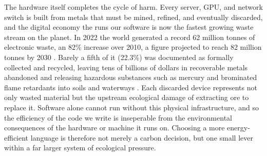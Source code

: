 The hardware itself completes the cycle of harm. Every server, GPU, and network switch is built from metals that must be mined, refined, and eventually discarded, and the digital economy the runs our software is now the fastest growing waste stream on the planet. In 2022 the world generated a record 62 million tonnes of electronic waste, an 82\% increase over 2010, a figure projected to reach 82 million tonnes by 2030 \cite{unitar_ewaste_monitor}. Barely a fifth of it (22.3\%) was documented as formally collected and recycled, leaving tens of billions of dollars in recoverable metals abandoned and releasing hazardous substances such as mercury and brominated flame retardants into soils and waterways \cite{unitar_ewaste_monitor}. Each discarded device represents not only wasted material but the upstream ecological damage of extracting ore to replace it. Software alone cannot run without this physical infrastructure, and so the efficiency of the code we write is inseperable from the environmental consequences of the hardware or machine it runs on. Choosing a more energy-efficient language is therefore not merely a carbon decision, but one small lever within a far larger system of ecological pressure.




















